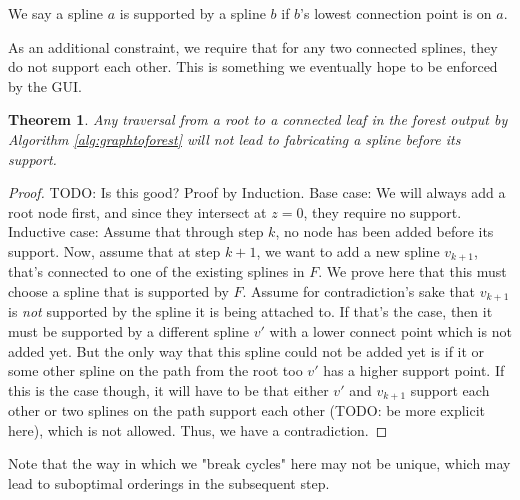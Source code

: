 \documentclass[conference]{acmsiggraph}
\newtheorem{theorem}{Theorem}[section]
\begin{document}
We say a spline $a$ is supported by a spline $b$ if $b$'s lowest connection point is on $a$.

As an additional constraint, we require that for any two connected splines, they do not support each other.  This is something we eventually hope to be enforced by the GUI.

\begin{theorem}
Any traversal from a root to a connected leaf in the forest output by Algorithm \ref{alg:graphtoforest} will not lead to fabricating a spline before its support.
\end{theorem}



\begin{proof}
TODO: Is this good?
Proof by Induction.
Base case: We will always add a root node first, and since they intersect at $z=0$, they require no support.
Inductive case: Assume that through step $k$, no node has been added before its support.  Now, assume that at step $k+1$, we want to add a new spline $v_{k+1}$, that's connected to one of the existing splines in $F$.  We prove here that this must choose a spline that is supported by $F$.  Assume for contradiction's sake that $v_{k+1}$ is \emph{not} supported by the spline it is being attached to.  If that's the case, then it must be supported by a different spline $v'$ with a lower connect point which is not added yet.  But the only way that this spline could not be added yet is if it or some other spline on the path from the root  too $v'$ has a higher support point.  If this is the case though, it will have to be that either $v'$ and $v_{k+1}$ support each other or two splines on the path support each other (TODO: be more explicit here), which is not allowed.  Thus, we have a contradiction.



\end{proof}

Note that the way in which we "break cycles" here may not be unique, which may lead to suboptimal orderings in the subsequent step.
\end{document}
